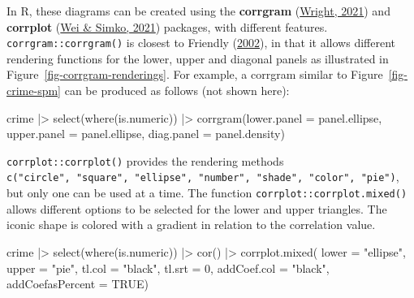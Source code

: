 \documentclass[
  letterpaper,
  10pt,
  krantz2]{krantz}
\makeatletter
\newenvironment{Shaded}{\begin{snugshade}}{\end{snugshade}}
\newcommand{\AttributeTok}[1]{\textcolor[rgb]{0.40,0.45,0.13}{#1}}
\newcommand{\ConstantTok}[1]{\textcolor[rgb]{0.56,0.35,0.01}{#1}}
\newcommand{\DecValTok}[1]{\textcolor[rgb]{0.68,0.00,0.00}{#1}}
\newcommand{\FunctionTok}[1]{\textcolor[rgb]{0.28,0.35,0.67}{#1}}
\newcommand{\NormalTok}[1]{\textcolor[rgb]{0.00,0.23,0.31}{#1}}
\newcommand{\SpecialCharTok}[1]{\textcolor[rgb]{0.37,0.37,0.37}{#1}}
\newcommand{\StringTok}[1]{\textcolor[rgb]{0.13,0.47,0.30}{#1}}
\newenvironment{kframe}{%
  \medskip{}
  \setlength{\fboxsep}{.8em}
  \def\at@end@of@kframe{}%
  \ifinner\ifhmode%
  \def\at@end@of@kframe{\end{minipage}}%
  \begin{minipage}{\columnwidth}%
  \fi\fi%
  \def\FrameCommand##1{\hskip\@totalleftmargin \hskip-\fboxsep
  \colorbox{shadecolor}{##1}\hskip-\fboxsep
      \hskip-\linewidth \hskip-\@totalleftmargin \hskip\columnwidth}%
  \MakeFramed {\advance\hsize-\width
    \@totalleftmargin\z@ \linewidth\hsize
    \@setminipage}}%
{\par\unskip\endMakeFramed%
  \at@end@of@kframe}
\renewenvironment{Shaded}{\begin{kframe}}{\end{kframe}}
\makeatother
\begin{document}
In R, these diagrams can be created using the \textbf{corrgram}
(\protect\hyperlink{ref-R-corrgram}{Wright, 2021}) and \textbf{corrplot}
(\protect\hyperlink{ref-R-corrplot}{Wei \& Simko, 2021}) packages, with
different features. \texttt{corrgram::corrgram()} is closest to Friendly
(\protect\hyperlink{ref-Friendly:02:corrgram}{2002}), in that it allows
different rendering functions for the lower, upper and diagonal panels
as illustrated in Figure~\ref{fig-corrgram-renderings}. For example, a
corrgram similar to Figure~\ref{fig-crime-spm} can be produced as
follows (not shown here):

\begin{Shaded}
\begin{Highlighting}[]
\NormalTok{crime }\SpecialCharTok{|\textgreater{}}
  \FunctionTok{select}\NormalTok{(}\FunctionTok{where}\NormalTok{(is.numeric)) }\SpecialCharTok{|\textgreater{}}
  \FunctionTok{corrgram}\NormalTok{(}\AttributeTok{lower.panel =}\NormalTok{ panel.ellipse,}
           \AttributeTok{upper.panel =}\NormalTok{ panel.ellipse,}
           \AttributeTok{diag.panel =}\NormalTok{ panel.density)}
\end{Highlighting}
\end{Shaded}

\texttt{corrplot::corrplot()} provides the rendering methods
\texttt{c("circle",\ "square",\ "ellipse",\ "number",\ "shade",\ "color",\ "pie")},
but only one can be used at a time. The function
\texttt{corrplot::corrplot.mixed()} allows different options to be
selected for the lower and upper triangles. The iconic shape is colored
with a gradient in relation to the correlation value.

\begin{Shaded}
\begin{Highlighting}[]
\NormalTok{crime }\SpecialCharTok{|\textgreater{}}
  \FunctionTok{select}\NormalTok{(}\FunctionTok{where}\NormalTok{(is.numeric)) }\SpecialCharTok{|\textgreater{}}
  \FunctionTok{cor}\NormalTok{() }\SpecialCharTok{|\textgreater{}}
  \FunctionTok{corrplot.mixed}\NormalTok{(}
           \AttributeTok{lower =} \StringTok{"ellipse"}\NormalTok{,}
           \AttributeTok{upper =} \StringTok{"pie"}\NormalTok{,}
           \AttributeTok{tl.col =} \StringTok{"black"}\NormalTok{,}
           \AttributeTok{tl.srt =} \DecValTok{0}\NormalTok{,}
           \AttributeTok{addCoef.col =} \StringTok{"black"}\NormalTok{,}
           \AttributeTok{addCoefasPercent =} \ConstantTok{TRUE}\NormalTok{)}
\end{Highlighting}
\end{Shaded}
\end{document}
